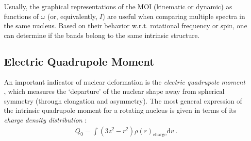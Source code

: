 Usually, the graphical representations of the MOI (kinematic or dynamic) as functions of $\omega$ (or, equivalently, $I$) are useful when comparing multiple spectra in the same nucleus. Based on their behavior w.r.t. rotational frequency or spin, one can determine if the bands belong to the same intrinsic structure.

\subsection{Electric Quadrupole Moment}
\label{intro-EM-chapter3}

An important indicator of nuclear deformation is the \emph{electric quadrupole moment} \cite{hamamoto2016interplay}, which measures the `departure' of the nuclear shape away from spherical symmetry (through elongation and asymmetry). The most general expression of the intrinsic quadrupole moment for a rotating nucleus is given in terms of its \emph{charge density distribution} \cite{casten2000nuclear}:
\begin{align}
    Q_0=\int(3z^2-r^2)\rho(r)_\text{charge}\text{d}v\ .
    \label{general-quadrupole-moment-Q0-charge}
\end{align}


